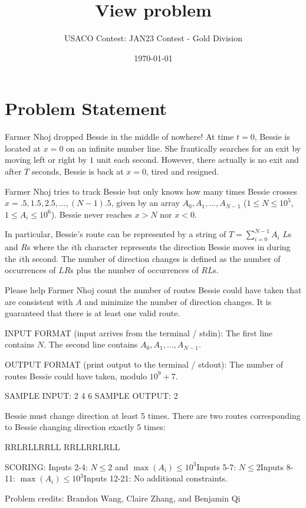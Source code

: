 \documentclass[12pt]{article}
\title{View problem}
\author{USACO Contest: JAN23 Contest - Gold Division}
\date{\today}
\begin{document}
\maketitle

\section*{Problem Statement}


Farmer Nhoj dropped Bessie in the middle of nowhere! At time $t=0$, Bessie is
located at $x=0$ on an infinite number line. She frantically searches for an
exit by moving left or right by $1$ unit each second. However, there actually is
no exit and after $T$ seconds, Bessie is back at $x=0$, tired and resigned. 

Farmer Nhoj tries to track Bessie but only knows how many times Bessie crosses
$x=.5, 1.5, 2.5, \ldots, (N-1).5$, given by an array $A_0,A_1,\dots,A_{N-1}$
($1\leq N \leq 10^5$, $1 \leq A_i \leq 10^6$). Bessie never reaches $x>N$ nor
$x<0$.

In particular, Bessie's route can be represented by a string of
$T = \sum_{i=0}^{N-1} A_i$ $L$s and $R$s where the $i$th character represents
the direction Bessie moves in during the $i$th second. The number of direction
changes is defined as the number of occurrences of  $LR$s plus the number of
occurrences of $RL$s. 

Please help Farmer Nhoj count the number of routes Bessie could have taken that
are consistent with $A$ and minimize the number of direction changes. It is
guaranteed that there is at least one valid route.

INPUT FORMAT (input arrives from the terminal / stdin):
The first line contains $N$. The second line contains $A_0,A_1,\dots,A_{N-1}$.

OUTPUT FORMAT (print output to the terminal / stdout):
The number of routes Bessie could have taken, modulo $10^9+7$.

SAMPLE INPUT:
2
4 6
SAMPLE OUTPUT: 
2

Bessie must change direction at least 5 times. There are two routes 
corresponding to Bessie changing direction exactly 5 times:


RRLRLLRRLL
RRLLRRLRLL

SCORING:
Inputs 2-4: $N\le 2$ and $\max(A_i)\le 10^3$Inputs 5-7: $N\le 2$Inputs 8-11: $\max(A_i)\le 10^3$Inputs 12-21: No additional constraints.


Problem credits: Brandon Wang, Claire Zhang, and Benjamin Qi
\end{document}

